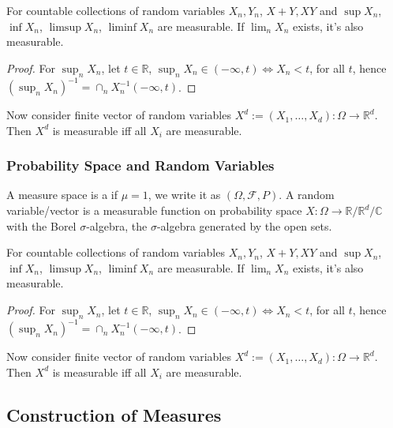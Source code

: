 \begin{thm}[Measurability]
    For countable collections of random variables \(X_{n}, Y_{n}\), \(X +Y, XY\) and \(\sup X_{n}\), \( \inf X_{n}\), \( \limsup X_{n}\), \( \liminf X_{n}\) are measurable. If \(\lim_{n} X_{n}\) exists, it's also measurable.
\end{thm}

\begin{proof}
    For \(\sup_{n} X_{n}\), let \(t \in \mathbb{R}\), \(\sup_{n} X_{n} \in (-\infty, t) \iff X_{n} < t\), for all \(t\), hence \((\sup_{n} X_{n})^{-1} = \cap_{n} X_{n} ^{-1} (- \infty, t)\).    
\end{proof}
Now consider finite vector of random variables \(X^{d} := (X_{1}, \dots,X_{d}) : \Omega \to \mathbb{R}^{d}\). Then \(X^{d}\) is measurable iff all \(X_{i}\) are measurable. 

\subsubsection{Probability Space and Random Variables}

A measure space is a  if \(\mu =1\), we write it as \((\Omega, \mathcal{F}, P)\). A random variable/vector is a measurable function on probability space \(X: \Omega \to \mathbb{R}/\mathbb{R}^{d}/\mathbb{C}\) with the Borel \(\sigma\)-algebra, the \(\sigma\)-algebra generated by the open sets.

\begin{thm}[Measurability]
    For countable collections of random variables \(X_{n}, Y_{n}\), \(X +Y, XY\) and \(\sup X_{n}\), \( \inf X_{n}\), \( \limsup X_{n}\), \( \liminf X_{n}\) are measurable. If \(\lim_{n} X_{n}\) exists, it's also measurable.
\end{thm}

\begin{proof}
    For \(\sup_{n} X_{n}\), let \(t \in \mathbb{R}\), \(\sup_{n} X_{n} \in (-\infty, t) \iff X_{n} < t\), for all \(t\), hence \((\sup_{n} X_{n})^{-1} = \cap_{n} X_{n} ^{-1} (- \infty, t)\).    
\end{proof}
Now consider finite vector of random variables \(X^{d} := (X_{1}, \dots,X_{d}) : \Omega \to \mathbb{R}^{d}\). Then \(X^{d}\) is measurable iff all \(X_{i}\) are measurable. 

\subsection{Construction of Measures}

